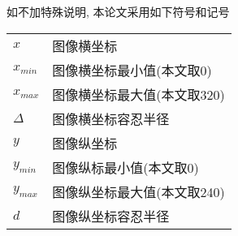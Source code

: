 \begin{symbolpage}

    如不加特殊说明, 本论文采用如下符号和记号
  
  \begin{longtable}{ll}
       $ x	$              &图像横坐标\\
       $x_{min}$	          &图像横坐标最小值(本文取0)\\
       $ x_{max}$	          &图像横坐标最大值(本文取320)\\
       $ \Delta $	              &图像横坐标容忍半径\\
       $ y	   $           &图像纵坐标\\
       $ y_{min}$	          &图像纵标最小值(本文取0)\\
       $y_{max}	$          &图像纵坐标最大值(本文取240)\\
       $ d	    $          &图像纵坐标容忍半径
  \end{longtable}
\end{symbolpage}
